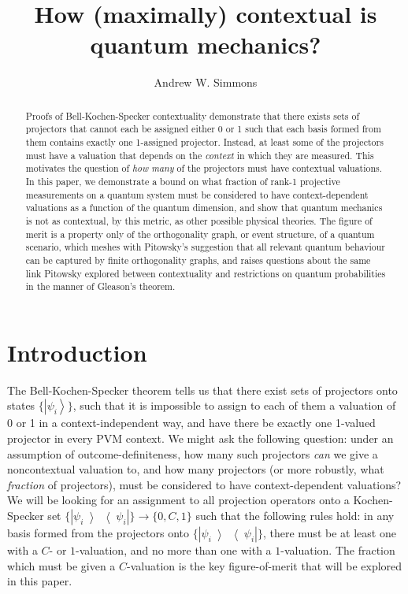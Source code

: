\documentclass{amsart}
\theoremstyle{definition}
\newcommand{\ket}[1]{{\left\vert{#1}\right\rangle}}
\newcommand{\ketbra}[1]{{\left\vert {#1}\middle\rangle\middle\langle{#1}\right\vert}}
\begin{document}
\title{How (maximally) contextual is quantum mechanics?}
\author{Andrew W. Simmons}
\address{Department of Physics, Imperial College London, SW7 2AZ.}
\begin{abstract}
Proofs of Bell-Kochen-Specker contextuality demonstrate that there exists sets of projectors that cannot each be assigned either 0 or 1 such that each basis formed from them contains exactly one 1-assigned projector. Instead, at least some of the projectors must have a valuation that depends on the \emph{context} in which they are measured. This motivates the question of \emph{how many} of the projectors must have contextual valuations.  In this paper, we demonstrate a bound on what fraction of rank-1 projective measurements on a quantum system must be considered to have context-dependent valuations as a function of the quantum dimension, and show that quantum mechanics is not as contextual, by this metric, as other possible physical theories. The figure of merit is a property only of the orthogonality graph, or event structure, of a quantum scenario, which meshes with Pitowsky’s suggestion that all relevant quantum behaviour can be captured by finite orthogonality graphs, and raises questions about the same link Pitowsky explored between contextuality and restrictions on quantum probabilities in the manner of Gleason’s theorem. 
\end{abstract}
\maketitle
\section{Introduction}

The Bell-Kochen-Specker theorem tells us that there exist sets of projectors onto states $\{\ket{\psi_i}\}$, such that it is impossible to assign to each of them a valuation of 0 or 1 in a context-independent way, and have there be exactly one 1-valued projector in every PVM context. We might ask the following question: under an assumption of outcome-definiteness, how many such projectors \emph{can} we give a noncontextual valuation to, and how many projectors (or more robustly, what \emph{fraction} of projectors), must be considered to have context-dependent valuations? We will be looking for an assignment to all projection operators onto a Kochen-Specker set $\{\ketbra{\psi_i}\}\rightarrow \{0,C,1\}$ such that the following rules hold: in any basis formed from the projectors onto $\{\ketbra{\psi_i}\}$, there must be at least one with a $C$- or $1$-valuation, and no more than one with a $1$-valuation. The fraction which must be given a $C$-valuation is the key figure-of-merit that will be explored in this paper. 
\end{document}
